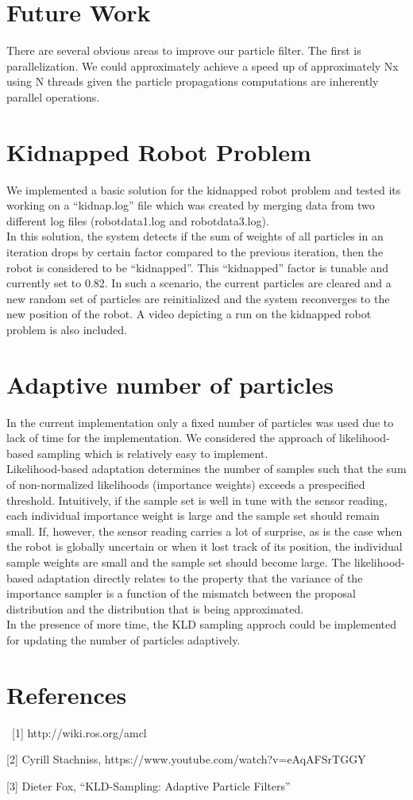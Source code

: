 \documentclass{article}
\begin{document}
\section{Future Work}

There are several obvious areas to improve our particle filter.  The first is parallelization. We could approximately achieve a speed up of approximately Nx using N threads given the particle propagations computations are inherently parallel operations.


\section{Kidnapped Robot Problem}

We implemented a basic solution for the kidnapped robot problem and tested its working on a ``kidnap.log'' file which was created by merging data from two different log files (robotdata1.log and robotdata3.log). \\
In this solution, the system detects if the sum of weights of all particles in an iteration drops by certain factor compared to the previous iteration, then the robot is considered to be ``kidnapped''. This ``kidnapped'' factor is tunable and currently set to 0.82. In such a scenario, the current particles are cleared and a new random set of particles are reinitialized and the system reconverges to the new position of the robot. A video depicting a run on the kidnapped robot problem is also included.

\section{Adaptive number of particles}

In the current implementation only a fixed number of particles was used due to lack of time for the implementation. We considered the approach of likelihood-based sampling which is relatively easy to implement. \\
Likelihood-based adaptation determines the number of samples such that the sum of non-normalized likelihoods (importance weights) exceeds a prespecified threshold. Intuitively, if the sample set is well in tune with the sensor reading, each individual importance weight is large and the sample set should remain small. If, however, the sensor reading carries a lot of surprise, as is the case when the robot is globally uncertain or when it lost track of its position, the individual sample weights are small and the sample set should become large. The likelihood-based adaptation directly relates to the property that the variance of the importance sampler is a function of the mismatch between the proposal distribution and the distribution that is being approximated. \\
In the presence of more time, the KLD sampling approch could be implemented for updating the number of particles adaptively.


\section{References}\
[1] http://wiki.ros.org/amcl 

[2] Cyrill Stachniss,  https://www.youtube.com/watch?v=eAqAFSrTGGY

[3] Dieter Fox, ``KLD-Sampling: Adaptive Particle Filters''
\end{document}
